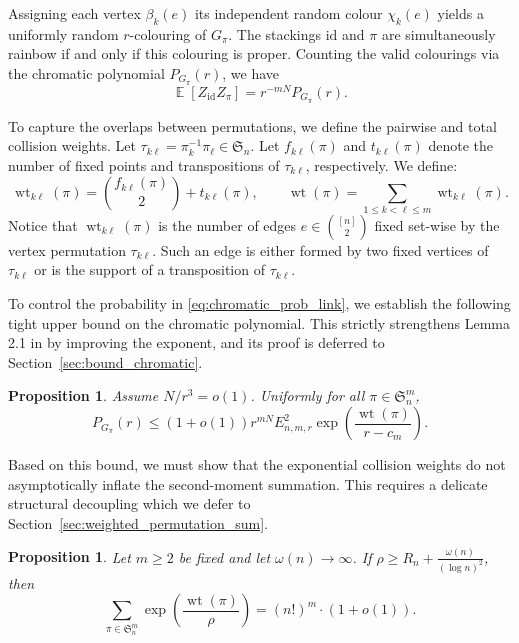 \documentclass[11pt,reqno]{amsart}
\newtheorem{proposition}[theorem]{Proposition}
\theoremstyle{definition}
\theoremstyle{remark}
\newcommand\E{\operatorname{\mathbb{E}}}
\renewcommand\leq{\leqslant}
\renewcommand\ge{\geqslant}
\renewcommand\to{\rightarrow}
\newcommand{\wt}{\operatorname{wt}}
\begin{document}
Assigning each vertex $\beta_k(e)$ its independent random colour $\chi_k(e)$ yields a uniformly random $r$-colouring of $G_\pi$. The stackings $\mathrm{id}$ and $\pi$ are simultaneously rainbow if and only if this colouring is proper. Counting the valid colourings via the chromatic polynomial $P_{G_\pi}(r)$, we have
\begin{equation}\label{eq:chromatic_prob_link}
\E[Z_{\mathrm{id}}Z_\pi] =r^{-mN}P_{G_\pi}(r).
\end{equation}

To capture the overlaps between permutations, we define the pairwise and total collision weights. Let $\tau_{k\ell}=\pi_k^{-1}\pi_\ell\in\mathfrak S_n$. Let $f_{k\ell}(\pi)$ and $t_{k\ell}(\pi)$ denote the number of fixed points and transpositions of $\tau_{k\ell}$, respectively. We define:
\begin{equation}\label{eq:weight_def}
        \wt_{k\ell}(\pi)=\binom{f_{k\ell}(\pi)}2+t_{k\ell}(\pi),
        \qquad
        \wt(\pi)=\sum_{1\leq k<\ell\leq m}\wt_{k\ell}(\pi).
\end{equation}
Notice that $\wt_{k\ell}(\pi)$ is the number of edges $e\in\binom{[n]}2$ fixed set-wise by the vertex permutation $\tau_{k\ell}$.  Such an edge is either formed by two fixed vertices of $\tau_{k\ell}$ or is the support of a transposition of $\tau_{k\ell}$.

To control the probability in \eqref{eq:chromatic_prob_link}, we establish the following tight upper bound on the chromatic polynomial. This strictly strengthens Lemma 2.1 in \cite{ADK}  by improving the exponent, and its proof is deferred to Section~\ref{sec:bound_chromatic}.

\begin{proposition}\label{prop:N_pi_final_bound}
Assume $N/r^3=o(1)$.  Uniformly for all $\pi\in\mathfrak S_n^m$,
\begin{equation}\label{eq:N_pi_formula}
        P_{G_\pi}(r) \leq (1+o(1))r^{mN}E_{n,m,r}^2 \exp\left(\frac{\wt(\pi)}{r-c_m}\right).
\end{equation}
\end{proposition}


Based on this bound, we must show that the exponential collision weights do not asymptotically inflate the second-moment summation. This requires a delicate structural decoupling which we defer to Section~\ref{sec:weighted_permutation_sum}.

\begin{proposition}\label{prop:weighted_permutation_sum}
Let $m\ge2$ be fixed and let $\omega(n)\to\infty$.  If $\rho\ge R_n+\frac{\omega(n)}{(\log n)^2}$, then
\begin{equation}\label{eq:target_sum}
       \sum_{\pi\in\mathfrak S_n^m}
        \exp\left(\frac{\wt(\pi)}\rho\right)
        =(n!)^m\cdot(1+o(1)).
\end{equation}
\end{proposition}
\end{document}
